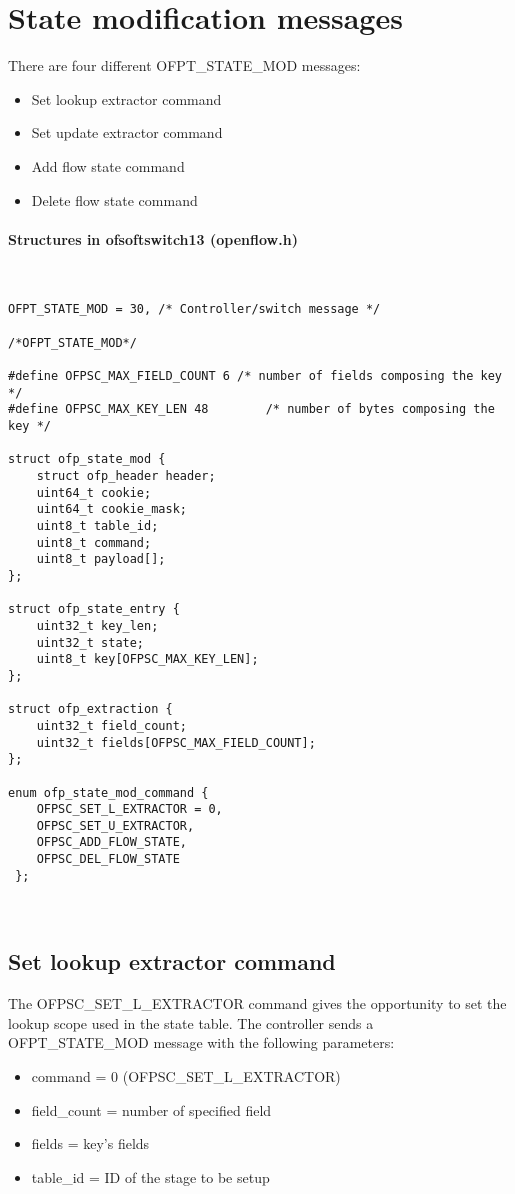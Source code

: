 \section{State modification messages}
\label{sec:msg_set_state}
There are four different OFPT\_STATE\_MOD messages: 
\begin{itemize}
\setlength\itemsep{0em}
\item Set lookup extractor command
\item Set update extractor command
\item Add flow state command
\item Delete flow state command
\end{itemize}
\paragraph{Structures in ofsoftswitch13 (openflow.h)}\mbox{}\\

\begin{lstlisting}[style=customc]
OFPT_STATE_MOD = 30, /* Controller/switch message */

/*OFPT_STATE_MOD*/

#define OFPSC_MAX_FIELD_COUNT 6	/* number of fields composing the key */
#define OFPSC_MAX_KEY_LEN 48		/* number of bytes composing the key */

struct ofp_state_mod {
    struct ofp_header header;
    uint64_t cookie;
    uint64_t cookie_mask;
    uint8_t table_id;
    uint8_t command;
    uint8_t payload[];
};

struct ofp_state_entry {
    uint32_t key_len;
    uint32_t state;
    uint8_t key[OFPSC_MAX_KEY_LEN];
};

struct ofp_extraction {
    uint32_t field_count;
    uint32_t fields[OFPSC_MAX_FIELD_COUNT];
};

enum ofp_state_mod_command {
	OFPSC_SET_L_EXTRACTOR = 0,
	OFPSC_SET_U_EXTRACTOR,
	OFPSC_ADD_FLOW_STATE,	
	OFPSC_DEL_FLOW_STATE
 };

\end{lstlisting}

\\

\subsection{Set lookup extractor command}
\label{subsec:set_l_extr}
The OFPSC\_SET\_L\_EXTRACTOR command gives the opportunity to set the lookup scope used in the state table.
The controller sends a OFPT\_STATE\_MOD message with the following parameters:
\begin{itemize}
\setlength\itemsep{0em}
\item command = 0 (OFPSC\_SET\_L\_EXTRACTOR)
\item field\_count = number of specified field 
\item fields = key’s fields
\item table\_id = ID of the stage to be setup
\end{itemize}

